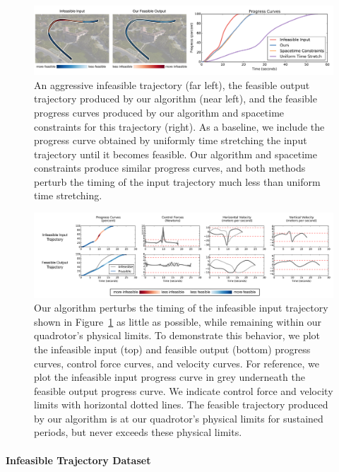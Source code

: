 \begin{figure}[t]
\centering
\includegraphics[width=6.0in]{images/2016_siggraph/05_easing_curve_comparison.pdf}
\caption{
An aggressive infeasible trajectory (far left), the feasible output trajectory produced by our algorithm (near left), and the feasible progress curves produced by our algorithm and spacetime constraints for this trajectory (right).
As a baseline, we include the progress curve obtained by uniformly time stretching the input trajectory until it becomes feasible. Our algorithm and spacetime constraints produce similar progress curves, and both methods perturb the timing of the input trajectory much less than uniform time stretching.
}
\label{fig:ch3:easing}
\end{figure}

\begin{figure}[t!]
\centering
\includegraphics[width=6.0in]{images/2016_siggraph/06_easing_curve_comparison_3.pdf}
\caption{
Our algorithm perturbs the timing of the infeasible input trajectory shown in Figure~\ref{fig:ch3:easing} as little as possible, while remaining within our quadrotor's physical limits.
To demonstrate this behavior, we plot the infeasible input (top) and feasible output (bottom) progress curves, control force curves, and velocity curves.
For reference, we plot the infeasible input progress curve in grey underneath the feasible output progress curve.
We indicate control force and velocity limits  with horizontal dotted lines.
The feasible trajectory produced by our algorithm is at our quadrotor's physical limits for sustained periods, but never exceeds these physical limits.
}
\label{fig:ch3:limits}
\end{figure}

\paragraph{Infeasible Trajectory Dataset}

